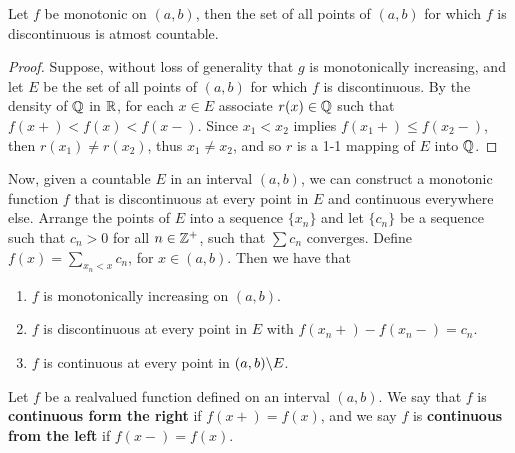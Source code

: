 \begin{theorem}\label{5.6.2}
    Let $f$ be monotonic on  $(a,b)$, then the set of all  points of $(a,b)$ for which 
    $f$ is  discontinuous is atmost countable.
\end{theorem}
\begin{proof}
    Suppose, without loss of generality that $g$ is monotonically increasing, and let  $E$ 
    be the set of all points of  $(a,b)$ for which  $f$ is discontinuous. By the density of 
    $\mathbb{Q}$ in  $\mathbb{R}$, for each $x \in E$ associate $r(x) \in \mathbb{Q}$ such that $f(x+)<f(x)<f(x-)$. 
    Since  $x_1 < x_2$ implies $f(x_1+) \leq f(x_2-)$, then $r(x_1) \neq r(x_2)$, thus 
    $x_1 \neq x_2$, and so $r$ is a 1-1 mapping of  $E$ into  $\mathbb{Q}$.
\end{proof}

Now, given a countable $E$ in an interval  $(a,b)$, we can construct a monotonic function $f$ that 
is discontinuous at every point in  $E$ and continuous everywhere else. Arrange  the points of  
$E$ into a sequence  $\{x_n\}$ and let  $\{c_n\}$ be a sequence such that  $c_n>0$ for 
all  $n \in \mathbb{Z}^+$, such that  $\sum{c_n}$ converges. Define  $f(x)=\sum_{x_n<x}{c_n}$, for 
$x \in (a,b)$. Then we have that 
    \begin{enumerate}[label=(\arabic*)]
        \item $f$ is monotonically increasing on $(a,b)$.
            
        \item $f$ is discontinuous at every point in $E$ with $f(x_n+)-f(x_n-)=c_n$.

        \item $f$ is continuous at every point in $(a,b) \backslash E$.
    \end{enumerate}

\begin{definition}
    Let $f$ be a realvalued function defined on an interval $(a,b)$. We say that $f$ is 
    \textbf{continuous form the right} if $f(x+)=f(x)$, and we say $f$ is \textbf{continuous from the 
    left} if $f(x-)=f(x)$.
\end{definition}
